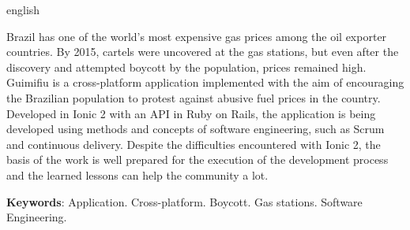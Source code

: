 \begin{resumo}[Abstract]
 \begin{otherlanguage*}{english}

     Brazil has one of the world's most expensive gas prices among the oil exporter countries. By 2015, cartels were uncovered at the gas stations, but even after the discovery and attempted boycott by the population, prices remained high. Guimifiu is a cross-platform application implemented with the aim of encouraging the Brazilian population to protest against abusive fuel prices in the country. Developed in Ionic 2 with an API in Ruby on Rails, the application is being developed using methods and concepts of software engineering, such as Scrum and continuous delivery. Despite the difficulties encountered with Ionic 2, the basis of the work is well prepared for the execution of the development process and the learned lessons can help the community a lot.

     \vspace{\onelineskip}
        
     \noindent
     \textbf{Keywords}: Application. Cross-platform. Boycott. Gas stations. Software Engineering. 
 \end{otherlanguage*}
\end{resumo}
